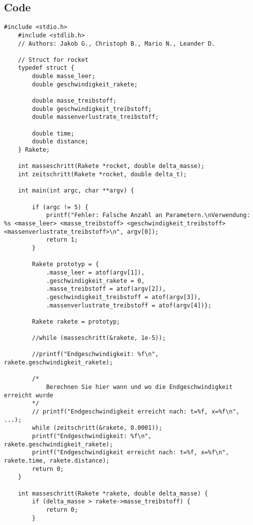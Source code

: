 \documentclass[12pt,a4paper]{article}
\begin{document}
\subsection{Code}
\begin{lstlisting}[caption={Rocket},label={lst:p7002}]
    #include <stdio.h>
    #include <stdlib.h>
    // Authors: Jakob G., Christoph B., Mario N., Leander D.

    // Struct for rocket
    typedef struct {
        double masse_leer;
        double geschwindigkeit_rakete;

        double masse_treibstoff;
        double geschwindigkeit_treibstoff;
        double massenverlustrate_treibstoff;

        double time;
        double distance;
    } Rakete;

    int masseschritt(Rakete *rocket, double delta_masse);
    int zeitschritt(Rakete *rocket, double delta_t);

    int main(int argc, char **argv) {
            
        if (argc != 5) {
            printf("Fehler: Falsche Anzahl an Parametern.\nVerwendung: %s <masse_leer> <masse_treibstoff> <geschwindigkeit_treibstoff> <massenverlustrate_treibstoff>\n", argv[0]);
            return 1;
        }

        Rakete prototyp = {
            .masse_leer = atof(argv[1]),
            .geschwindigkeit_rakete = 0,
            .masse_treibstoff = atof(argv[2]),
            .geschwindigkeit_treibstoff = atof(argv[3]),
            .massenverlustrate_treibstoff = atof(argv[4])};

        Rakete rakete = prototyp;

        //while (masseschritt(&rakete, 1e-5));

        //printf("Endgeschwindigkeit: %f\n", rakete.geschwindigkeit_rakete);

        /*
            Berechnen Sie hier wann und wo die Endgeschwindigkeit erreicht wurde
        */
        // printf("Endgeschwindigkeit erreicht nach: t=%f, x=%f\n", ...);
        while (zeitschritt(&rakete, 0.0001));
        printf("Endgeschwindigkeit: %f\n", rakete.geschwindigkeit_rakete);
        printf("Endgeschwindigkeit erreicht nach: t=%f, x=%f\n", rakete.time, rakete.distance);
        return 0;
    }

    int masseschritt(Rakete *rakete, double delta_masse) {
        if (delta_masse > rakete->masse_treibstoff) {
            return 0;
        }


\end{lstlisting}
\end{document}
